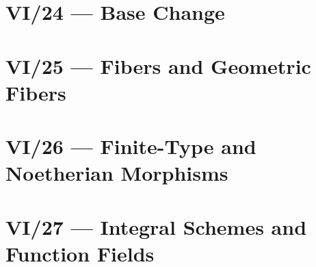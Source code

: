 \section{VI/24 --- Base Change}







\section{VI/25 --- Fibers and Geometric Fibers}







\section{VI/26 --- Finite-Type and Noetherian Morphisms}









\section{VI/27 --- Integral Schemes and Function Fields}




